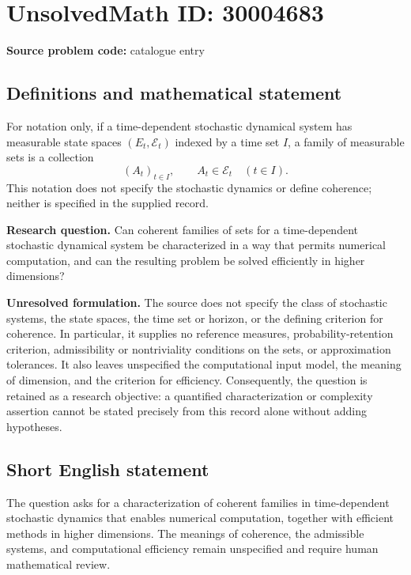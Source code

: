 \documentclass[11pt]{article}
\begin{document}
\section*{UnsolvedMath ID: 30004683}
\textbf{Source problem code:} catalogue entry
\subsection{Definitions and mathematical statement}
For notation only, if a time-dependent stochastic dynamical system has measurable state spaces \((E_t,\mathcal{E}_t)\) indexed by a time set \(I\), a family of measurable sets is a collection
\[
(A_t)_{t\in I},\qquad A_t\in\mathcal{E}_t\quad(t\in I).
\]
This notation does not specify the stochastic dynamics or define coherence; neither is specified in the supplied record.

\textbf{Research question.} Can coherent families of sets for a time-dependent stochastic dynamical system be characterized in a way that permits numerical computation, and can the resulting problem be solved efficiently in higher dimensions?

\textbf{Unresolved formulation.} The source does not specify the class of stochastic systems, the state spaces, the time set or horizon, or the defining criterion for coherence. In particular, it supplies no reference measures, probability-retention criterion, admissibility or nontriviality conditions on the sets, or approximation tolerances. It also leaves unspecified the computational input model, the meaning of dimension, and the criterion for efficiency. Consequently, the question is retained as a research objective: a quantified characterization or complexity assertion cannot be stated precisely from this record alone without adding hypotheses.
\subsection{Short English statement}
The question asks for a characterization of coherent families in time-dependent stochastic dynamics that enables numerical computation, together with efficient methods in higher dimensions. The meanings of coherence, the admissible systems, and computational efficiency remain unspecified and require human mathematical review.
\end{document}
